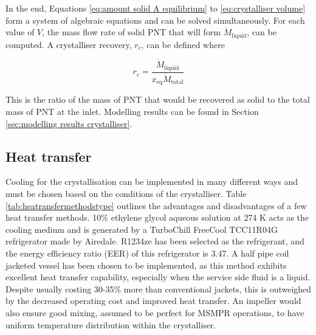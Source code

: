 
In the end, Equations \ref{eq:amount solid A equilibrium} to \ref{eq:crystalliser volume} form a system of algebraic equations and can be solved simultaneously. For each value of $V$, the mass flow rate of solid PNT that will form $\dot{M}_{\mathrm{liquid}}$, can be computed. A crystalliser recovery, $r_c$, can be defined where

\begin{equation} \label{eq:definition of recovery}
    r_c = \frac{\dot{M}_{\mathrm{liquid}}}{x_{\mathrm{eq}} \dot{M}_{\mathrm{total}}}
\end{equation}

\noindent This is the ratio of the mass of PNT that would be recovered as solid to the total mass of PNT at the inlet. Modelling results can be found in Section \ref{sec:modelling results crystalliser}.

\subsection{Heat transfer}\label{sec:heat transfer crystalliser}

Cooling for the crystallisation can be implemented in many different ways and must be chosen based on the conditions of the crystalliser. Table \ref{tab:heatransfermethodstype} outlines the advantages and disadvantages of a few heat transfer methods. 10\% ethylene glycol aqueous solution at 274 K acts as the cooling medium and is generated by a TurboChill FreeCool TCC11R04G refrigerator made by Airedale. R1234ze has been selected as the refrigerant, and the energy efficiency ratio (EER) of this refrigerator is 3.47. A half pipe coil jacketed vessel has been chosen to be implemented, as this method exhibits excellent heat transfer capability, especially when the service side fluid is a liquid. Despite usually costing 30-35\% more than conventional jackets, this is outweighed by the decreased operating cost and improved heat transfer. An impeller would also ensure good mixing, assumed to be perfect for MSMPR operations, to have uniform temperature distribution within the crystalliser. 

